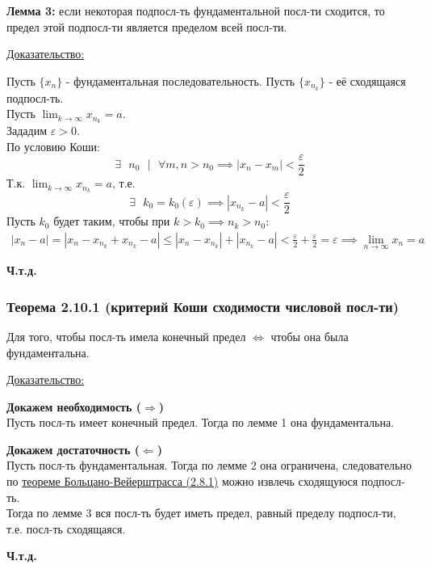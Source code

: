 \documentclass[12pt]{article}
\def\posl#1#2{\{#1_{#2}\}}
\begin{document}
    \noindent \textbf{Лемма 3:} если некоторая подпосл-ть фундаментальной посл-ти сходится, то предел этой подпосл-ти является пределом всей посл-ти.\par\noindent
    \underline{Доказательство:}
    \begin{adjustwidth}{1.5em}{1.5em}
        Пусть $\posl{x}{n}$ - фундаментальная последовательность. Пусть $\posl{x}{n_k}$ - её сходящаяся подпосл-ть.\\
        Пусть $\lim_{k\to\infty}x_{n_k} = a$.\\
        Зададим $\varepsilon > 0$.\\
        По условию Коши:
        \[ \exists \text{ } n_0 \text{ } \big| \text{ } \forall m,n > n_0 \implies |x_n - x_m| < \frac{\varepsilon}{2} \]
        Т.к. $\lim_{k\to\infty}x_{n_k} = a$, т.е.
        \[ \exists \text{ } k_0 = k_0(\varepsilon) \implies |x_{n_k} - a| < \frac{\varepsilon}{2} \]
        Пусть $k_0$ будет таким, чтобы при $k > k_0 \implies n_k > n_0$:\\
        \begin{gather*}
            |x_n - a| = |x_n - x_{n_k} + x_{n_k} - a| \le |x_n - x_{n_k}| + |x_{n_k} - a| < \frac{\varepsilon}{2} + \frac{\varepsilon}{2} = \varepsilon \implies \lim_{n\to\infty} x_n = a
        \end{gather*}
        \begin{center}
            \textbf{Ч.т.д.}
        \end{center}
    \end{adjustwidth}

    \subsubsection*{Теорема 2.10.1 (критерий Коши сходимости числовой посл-ти)}\label{th:2.10.1}
    Для того, чтобы посл-ть имела конечный предел $\Longleftrightarrow$ чтобы она была фундаментальна.\par\noindent
    \underline{Доказательство:}\par\noindent
    \begin{adjustwidth}{1.5em}{1.5em}
        \textbf{Докажем необходимость ($\Rightarrow$)}\\
        Пусть посл-ть имеет конечный предел. Тогда по лемме 1 она фундаментальна.\par\noindent
        \textbf{Докажем достаточность ($\Leftarrow$)}\\
        Пусть посл-ть фундаментальная. Тогда по лемме 2 она ограничена, следовательно по \hyperref[th:2.8.1]{теореме Больцано-Вейерштрасса (2.8.1)} можно извлечь сходящуюся подпосл-ть.\\
        Тогда по лемме 3 вся посл-ть будет иметь предел, равный пределу подпосл-ти, т.е. посл-ть сходящаяся.
        \begin{center}
            \textbf{Ч.т.д.}
        \end{center}
    \end{adjustwidth}
\end{document}
